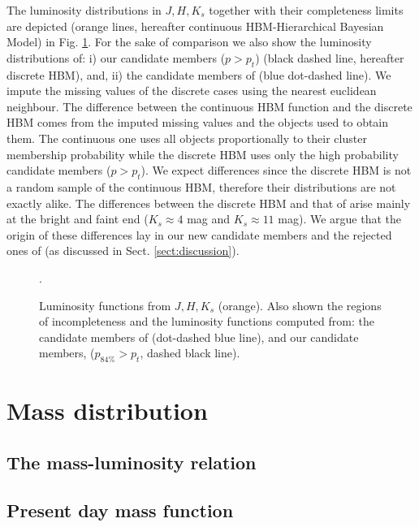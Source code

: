 The luminosity distributions in $J,H,K_s$ together with their completeness limits are depicted (orange lines, hereafter continuous HBM-Hierarchical Bayesian Model) in Fig. \ref{figure:Luminosities}. For the sake of comparison we also show the luminosity distributions of: i) our candidate members ($p>p_t$) (black dashed line, hereafter discrete HBM), and, ii) the candidate members of \citet{Bouy2015} (blue dot-dashed line). We impute the missing values of the discrete cases using the nearest euclidean neighbour. The difference between the continuous HBM function and the discrete HBM comes from the imputed missing values and the objects used to obtain them. The continuous one uses all objects proportionally to their cluster membership probability while the discrete HBM uses only the high probability candidate members ($p>p_t$). We expect differences since the discrete HBM is not a random sample of the continuous HBM, therefore their distributions are not exactly alike. The differences between the discrete HBM and that of \citet{Bouy2015} arise mainly at the bright and faint end ($K_s\approx 4$ mag and $K_s\approx11$ mag). We argue that the origin of these differences lay in our new candidate members and the rejected ones of \citet{Bouy2015} (as discussed in Sect. \ref{sect:discussion}).

\begin{figure}[htbp]
\begin{center}
\caption{Luminosity functions from $J,H,K_s$ (orange). Also shown the regions of incompleteness and the luminosity functions computed from: the candidate members of \citet{Bouy2015} (dot-dashed blue line), and our candidate members, ($p_{84\%}>p_t$, dashed black line).}
\label{figure:Luminosities}.
\end{center}
\end{figure}

\section{Mass distribution}
\subsection{The mass-luminosity relation}
\subsection{Present day mass function}

